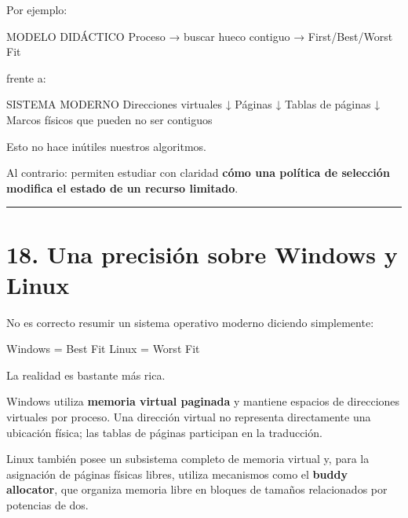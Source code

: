 \documentclass[
  spanish,
  letterpaper,
]{scrbook}
\newenvironment{Shaded}{\begin{snugshade}}{\end{snugshade}}
\newcommand{\NormalTok}[1]{\textcolor[rgb]{0.00,0.23,0.31}{#1}}
\begin{document}
Por ejemplo:

\begin{Shaded}
\begin{Highlighting}[]
\NormalTok{MODELO DIDÁCTICO}
\NormalTok{Proceso → buscar hueco contiguo → First/Best/Worst Fit}
\end{Highlighting}
\end{Shaded}

frente a:

\begin{Shaded}
\begin{Highlighting}[]
\NormalTok{SISTEMA MODERNO}
\NormalTok{Direcciones virtuales}
\NormalTok{        ↓}
\NormalTok{Páginas}
\NormalTok{        ↓}
\NormalTok{Tablas de páginas}
\NormalTok{        ↓}
\NormalTok{Marcos físicos que pueden no ser contiguos}
\end{Highlighting}
\end{Shaded}

Esto no hace inútiles nuestros algoritmos.

Al contrario: permiten estudiar con claridad \textbf{cómo una política
de selección modifica el estado de un recurso limitado}.

\begin{center}\rule{0.5\linewidth}{0.5pt}\end{center}


\chapter{18. Una precisión sobre Windows y
Linux}\label{una-precisiuxf3n-sobre-windows-y-linux}

No es correcto resumir un sistema operativo moderno diciendo
simplemente:

\begin{Shaded}
\begin{Highlighting}[]
\NormalTok{Windows = Best Fit}
\NormalTok{Linux   = Worst Fit}
\end{Highlighting}
\end{Shaded}

La realidad es bastante más rica.

Windows utiliza \textbf{memoria virtual paginada} y mantiene espacios de
direcciones virtuales por proceso. Una dirección virtual no representa
directamente una ubicación física; las tablas de páginas participan en
la traducción.

Linux también posee un subsistema completo de memoria virtual y, para la
asignación de páginas físicas libres, utiliza mecanismos como el
\textbf{buddy allocator}, que organiza memoria libre en bloques de
tamaños relacionados por potencias de dos.
\end{document}
